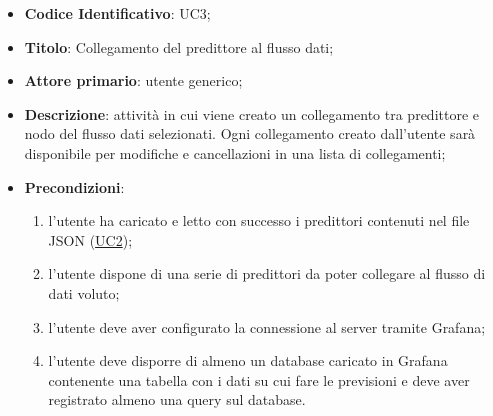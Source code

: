 		\begin{itemize}
			\item\textbf{Codice Identificativo}: UC3;
			\item\textbf{Titolo}: Collegamento del predittore al flusso dati;
			\item\textbf{Attore primario}: utente generico;
			\item\textbf{Descrizione}: attività in cui viene creato un collegamento tra predittore e nodo del flusso dati selezionati. Ogni collegamento creato dall'utente sarà disponibile per modifiche e cancellazioni in una lista di collegamenti;
			\item\textbf{Precondizioni}:
				\begin{enumerate}
					\item l'utente ha caricato e letto con successo i predittori contenuti nel file JSON (\hyperref[par:UC2]{UC2});
					\item l'utente dispone di una serie di predittori da poter collegare al flusso di dati voluto;
					\item l’utente deve aver configurato la connessione al server tramite Grafana;
					\item l’utente deve disporre di almeno un database caricato in Grafana contenente una tabella con i dati su cui fare le previsioni e deve aver registrato almeno una query sul database.
					


\end{enumerate}
\end{itemize}
